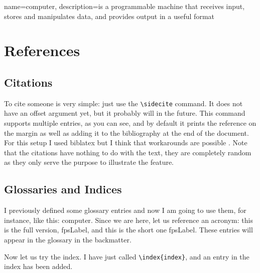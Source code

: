 {
  name=computer,
  description={is a programmable machine that receives input,
               stores and manipulates data, and provides
               output in a useful format}
}

\renewcommand*{\chapterformat}
{
  \enskip\mbox{\scalebox{4}{\thechapter\autodot}}
}
\renewcommand\chapterlinesformat[3]
{
  \parbox[b]{\textwidth}{\hrulefill#2}\par%
  #3%
  \parbox[b]{\textwidth+\marginparsep+\marginparwidth}{\hrulefill}%
}
\setchapterpreamble[u]{\margintoc}
\chapter{References}

\section{Citations}

To cite someone  is very simple: just 
use the \verb|\sidecite| command. It does not have an offset argument 
yet, but it probably will in the future. This command supports multiple 
entries, as you can see, and by default it prints the reference on the 
margin as well as adding it to the bibliography at the end of the 
document. For this setup I used biblatex but I think that workarounds 
are possible . Note that the citations have nothing 
to do with the text, they are completely random as they only serve the 
purpose to illustrate the feature.

\section{Glossaries and Indices}

I previously defined some glossary entries and now I am going to use 
them, for instance, like this: \gls{computer}. Since we are here, let us 
reference an acronym: this is the full version, \acrfull{fpsLabel}, and 
this is the short one \acrshort{fpsLabel}. These entries will appear in 
the glossary in the backmatter.

Now let us try the index. I have just called 
\verb|\index{index}|, and an entry in the index has been added.
